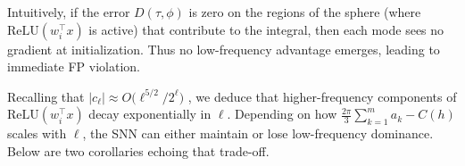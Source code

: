 \documentclass[review,onefignum,onetabnum,onealgnum]{siamart250106}
\numberwithin{theorem}{section}
\begin{document}



\begin{remark}
Intuitively, if the error \(D(\tau,\phi)\) is zero on the regions of the sphere 
(where $\mathrm{ReLU}(w_i^\top x)$ is active) that contribute to the integral, 
then each mode sees no gradient at initialization.  Thus no low-frequency advantage emerges, leading to 
immediate FP violation.
\end{remark}


Recalling that \(\bigl|c_{\ell}\bigr|\approx O\!\bigl(\ell^{5/2}/2^\ell\bigr)\) , we deduce that higher-frequency components of \(\mathrm{ReLU}(w_i^\top x)\) decay exponentially in \(\ell\).  Depending on how
\(\tfrac{2\pi}{3}\sum_{k=1}^m a_k - C(h)\) scales with $\ell$, the SNN can either maintain or lose low-frequency dominance.  
Below are two corollaries echoing that trade-off.
\end{document}
